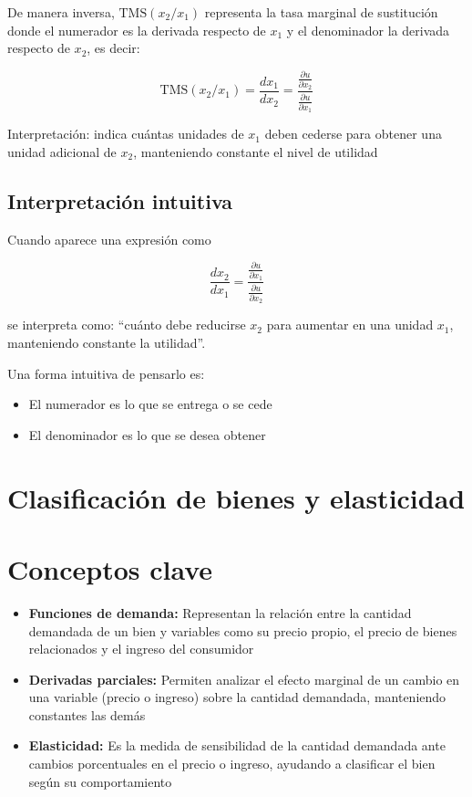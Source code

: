 \documentclass{article}
\begin{document}
\medskip

De manera inversa, {\color{teal}\( \text{TMS}(x_2/x_1) \)} representa la tasa marginal de sustitución donde el numerador es la derivada respecto de \( x_1 \) y el denominador la derivada respecto de \( x_2 \), es decir:

\[
\text{TMS}(x_2/x_1) = \frac{dx_1}{dx_2} = \frac{\frac{\partial u}{\partial x_2}}{\frac{\partial u}{\partial x_1}}
\]

{\color{teal}Interpretación: indica cuántas unidades de \( x_1 \) deben cederse para obtener una unidad adicional de \( x_2 \), manteniendo constante el nivel de utilidad}


\subsection*{Interpretación intuitiva}

Cuando aparece una expresión como

\[
\frac{dx_2}{dx_1} = \frac{\frac{\partial u}{\partial x_1}}{\frac{\partial u}{\partial x_2}}
\]

se interpreta como: {\color{teal}“cuánto debe reducirse \( x_2 \) para aumentar en una unidad \( x_1 \), manteniendo constante la utilidad”}.

\medskip

Una forma intuitiva de pensarlo es:

\begin{itemize}
  \item {\color{teal}El numerador es lo que se entrega o se cede}
  \item {\color{teal}El denominador es lo que se desea obtener}
\end{itemize}


\newpage
\section{Clasificación de bienes y elasticidad}


\section*{Conceptos clave}

\begin{itemize}
    \item \textbf{\color{teal}Funciones de demanda:} Representan la relación entre la cantidad demandada de un bien y variables como su precio propio, el precio de bienes relacionados y el ingreso del consumidor
    \item \textbf{\color{teal}Derivadas parciales:} Permiten analizar el efecto marginal de un cambio en una variable (precio o ingreso) sobre la cantidad demandada, manteniendo constantes las demás
    \item \textbf{\color{teal}Elasticidad:} Es la medida de sensibilidad de la cantidad demandada ante cambios porcentuales en el precio o ingreso, ayudando a clasificar el bien según su comportamiento
\end{itemize}
\end{document}
